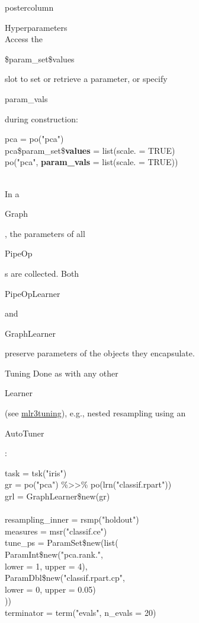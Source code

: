 \documentclass{beamer}
\newcommand{\codeinline}[1]{\begin{codeboxinline}#1\end{codeboxinline}}
\begin{document}
\begin{frame}[fragile]{}
\begin{columns}
\begin{column}{.245\textwidth}
\begin{beamercolorbox}[center]{postercolumn}
\begin{minipage}{.98\textwidth}
{\begin{myblock}{Hyperparameters}
              \ \\
              Access the \codeinline{\$param\_set\$values} slot to set or retrieve a parameter, or specify \codeinline{param\_vals} during construction:
              \begin{codeboxmultiline}[width=25cm]
                pca = po("pca") \\
                pca\$param\_set\$\textbf{values} = list(scale. = TRUE) \\
                po("pca", \textbf{param\_vals} = list(scale. = TRUE))
              \end{codeboxmultiline}
              \ \\
              In a \codeinline{Graph}, the parameters of all \codeinline{PipeOp}s are collected. Both \codeinline{PipeOpLearner} and \codeinline{GraphLearner} preserve parameters of the objects they encapsulate.
            \end{myblock}
            \begin{myblock}{Tuning}
              Done as with any other \codeinline{Learner} (see \href{FIXME:CheatsheetLink}{mlr3tuning}), e.g., nested resampling using an \codeinline{AutoTuner}:
              \begin{codeboxexample}
						  {\footnotesize
                task = tsk("iris")\\
                gr = po("pca") \%>>\% po(lrn("classif.rpart"))\\
                grl = GraphLearner\$new(gr)\\
                \ \\
                resampling\_inner = rsmp("holdout")\\
                measures = msr("classif.ce")\\
                tune\_ps = ParamSet\$new(list(\\
                \hspace*{1ex} ParamInt\$new("pca.rank.",\\
                \hspace*{2ex} lower = 1, upper = 4),\\
                \hspace*{1ex} ParamDbl\$new("classif.rpart.cp",\\
                \hspace*{2ex} lower = 0, upper = 0.05)\\
                ))\\
                terminator = term("evals", n\_evals = 20)\\
}
\end{codeboxexample}
\end{myblock}}
\end{minipage}
\end{beamercolorbox}
\end{column}
\end{columns}
\end{frame}
\end{document}

